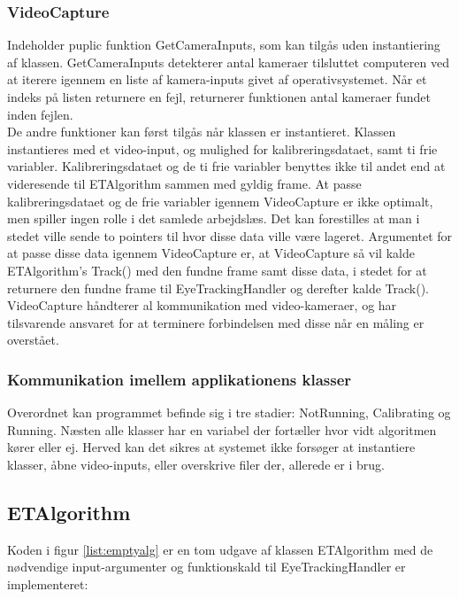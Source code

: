 \documentclass[rapport.tex]{subfiles}
\begin{document}
	\subsubsection{VideoCapture}
	Indeholder puplic funktion GetCameraInputs, som kan tilgås uden instantiering af klassen. GetCameraInputs detekterer antal kameraer tilsluttet computeren ved at iterere igennem en liste af kamera-inputs givet af operativsystemet. Når et indeks på listen returnere en fejl, returnerer funktionen antal kameraer fundet inden fejlen.\\
	
	De andre funktioner kan først tilgås når klassen er instantieret. Klassen instantieres med et video-input, og mulighed for kalibreringsdataet, samt ti frie variabler. Kalibreringsdataet og de ti frie variabler benyttes ikke til andet end at videresende til ETAlgorithm sammen med gyldig frame. 
	At passe kalibreringsdataet og de frie variabler igennem VideoCapture er ikke optimalt, men spiller ingen rolle i det samlede arbejdslæs. Det kan forestilles at man i stedet ville sende to pointers til hvor disse data ville være lageret. Argumentet for at passe disse data igennem VideoCapture er, at VideoCapture så vil kalde ETAlgorithm's Track() med den fundne frame samt disse data, i stedet for at returnere den fundne frame til EyeTrackingHandler og derefter kalde Track(). VideoCapture håndterer al kommunikation med video-kameraer, og har tilsvarende ansvaret for at terminere forbindelsen med disse når en måling er overstået. 
		
	\subsubsection{Kommunikation imellem applikationens klasser}	
	
	Overordnet kan programmet befinde sig i tre stadier: NotRunning, Calibrating og Running.
	Næsten alle klasser har en variabel der fortæller hvor vidt algoritmen kører eller ej. Herved kan det sikres at systemet ikke forsøger at instantiere klasser, åbne video-inputs, eller overskrive filer der, allerede er i brug.
	
	\subsection{ETAlgorithm}
	Koden i figur \ref{list:emptyalg} er en tom udgave af klassen ETAlgorithm med de nødvendige input-argumenter og funktionskald til EyeTrackingHandler er implementeret:
\end{document}
